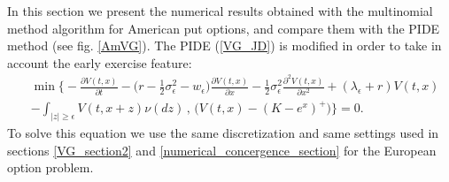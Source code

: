 In this section we present the numerical results obtained with the multinomial method algorithm for American put options, and compare them with the PIDE method (see fig. \ref{AmVG}).
The PIDE (\ref{VG_JD}) is modified in order to take in account the early exercise feature:
\begin{align}\label{VG_Am_JD}
&  \min \biggl\{ - \frac{\partial V(t,x)}{\partial t} -
 \bigl( r-\frac{1}{2}\sigma_{\epsilon}^2 - w_{\epsilon} \bigr) \frac{\partial V(t,x)}{\partial x} 
 - \frac{1}{2}\sigma_{\epsilon}^2 \frac{\partial^2 V(t,x)}{\partial x^2} + (\lambda_{\epsilon} + r) V(t,x) \\ \nonumber
 &- \int_{|z| \geq \epsilon} V(t,x+z) \nu(dz) \, , \, \biggl( V(t,x) - (K-e^x)^+ \biggr) \biggr\} = 0.
\end{align}
To solve this equation we use the same discretization and same settings used in sections \ref{VG_section2} and \ref{numerical_concergence_section} for the European option problem.

